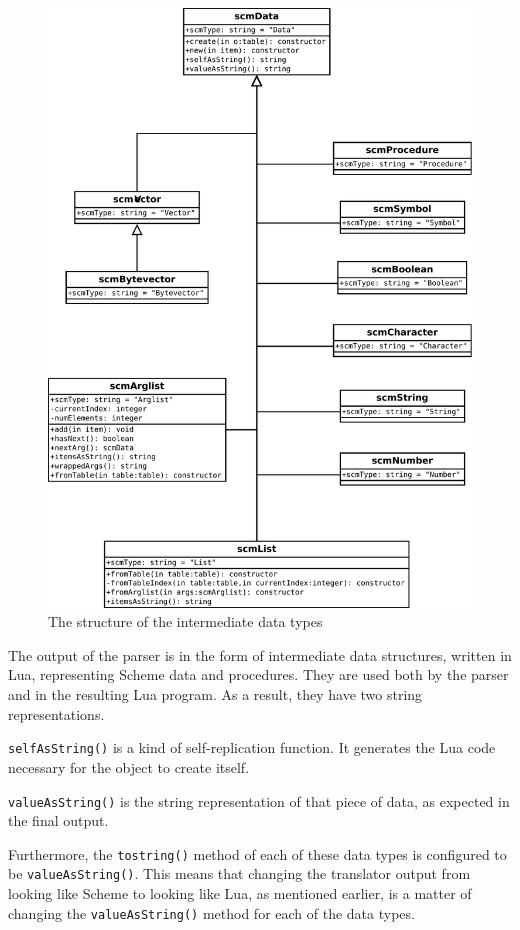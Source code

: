 \begin{figure}
\centering
\includegraphics[width=\textwidth]{scmDataUML.pdf}
\caption{The structure of the intermediate data types}
\label{fig:scmDataUML}
\end{figure}

The output of the parser is in the form of intermediate data structures, written
in Lua, representing Scheme data and procedures. They are used both by the
parser and in the resulting Lua program. As a result, they have two
string representations.
\begin{description}
\item \texttt{selfAsString()} is a kind of self-replication function. It
generates the Lua code necessary for the object to create itself.
\item \texttt{valueAsString()} is the string representation of that piece of
data, as expected in the final output.
\end{description}
Furthermore, the \texttt{tostring()} method of each of these data types is
configured to be \texttt{valueAsString()}. This means that changing the
translator output from looking like Scheme to looking like Lua, as mentioned
earlier, is a matter of changing the \texttt{valueAsString()} method for each of
the data types.

